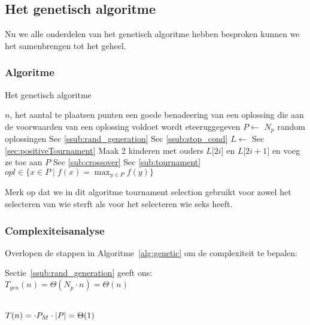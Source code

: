
\subsection{Het genetisch algoritme}
\label{ssub:genetic}
Nu we alle onderdelen van het genetisch algoritme hebben besproken kunnen we het samenbrengen tot het geheel.

\subsubsection{Algoritme}
	\begin{algorithm}[H]
	 	\caption{Het genetisch algoritme}
		\begin{algorithmic}
		\Require $n$, het aantal te plaatsen punten
		\Ensure een goede benadeering van een oplossing die aan de voorwaarden van een oplossing voldoet wordt eteeruggegeven
		\State $P \gets $ $N_p$ random oplossingen 
		\Comment Sec \ref{ssub:rand_generation}
		\Comment Sec \ref{ssub:stop_cond}
			\State $L \gets$  
			\Comment Sec \ref{sec:positiveTournament}
				\State Maak 2 kinderen met ouders 
				\State $L\lbrack2i\rbrack$ en  $L\lbrack2i+1\rbrack$ en voeg ze 
				\State toe aan $P$ 
				\Comment Sec \ref{sub:crossover}
			\EndFor
			\State {} 
			\Comment Sec \ref{sub:tournament}
		\EndWhile 
		\State \Return  $\displaystyle opl \in \lbrace x \in P \mid f(x) = \max_{y\in P}{f(y)}  \rbrace$
		\EndFunction
		\end{algorithmic}
		\label{alg:genetic}
	\end{algorithm}		
    Merk op dat we in dit algoritme tournament selection gebruikt voor zowel het selecteren van wie sterft als voor het selecteren wie seks heeft. 
\subsubsection{Complexiteisanalyse}
  Overlopen de stappen in Algoritme~\ref{alg:genetic} om de complexiteit te bepalen:
\begin{enumerate}
	 Sectie~\ref{ssub:rand_generation} geeft ons:\\ $T_{gen}(n)=\Theta(N_p\cdot n) = \Theta(n)$ 
	\begin{enumerate}
	 \\$T(n)= \cdot P_M \cdot \lvert P \rvert = \Theta(1)$ 
	\end{enumerate}
	
\end{enumerate}


